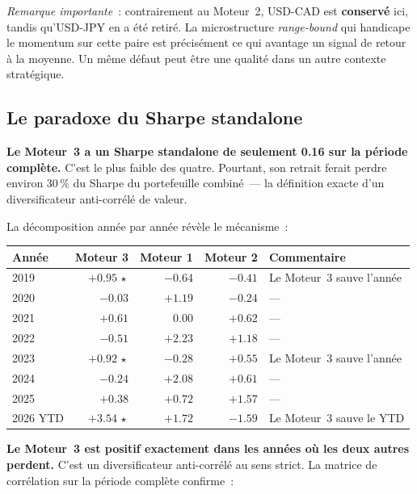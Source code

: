 \textit{Remarque importante}~: contrairement au Moteur~2, USD-CAD est \textbf{conservé} ici, tandis qu'USD-JPY en a été retiré. La microstructure \emph{range-bound} qui handicape le momentum sur cette paire est précisément ce qui avantage un signal de retour à la moyenne. Un même défaut peut être une qualité dans un autre contexte stratégique.

\subsection{Le paradoxe du Sharpe standalone}

\begin{warningbox}
\textbf{Le Moteur~3 a un Sharpe standalone de seulement 0.16 sur la période complète.} C'est le plus faible des quatre. Pourtant, son retrait ferait perdre environ 30\,\% du Sharpe du portefeuille combiné~--- la définition exacte d'un diversificateur anti-corrélé de valeur.
\end{warningbox}

La décomposition année par année révèle le mécanisme~:

\begin{center}
\renewcommand{\arraystretch}{1.1}
\begin{tabular}{lrrr p{4cm}}
\toprule
\textbf{Année} & \textbf{Moteur 3} & \textbf{Moteur 1} & \textbf{Moteur 2} & \textbf{Commentaire} \\
\midrule
2019 & \textcolor{rsiGreen}{$+0.95\,\star$} & $-0.64$ & $-0.41$ & Le Moteur~3 sauve l'année \\
2020 & $-0.03$ & $+1.19$ & $-0.24$ & --- \\
2021 & $+0.61$ & $0.00$ & $+0.62$ & --- \\
2022 & $-0.51$ & \textcolor{rsiGreen}{$+2.23$} & $+1.18$ & --- \\
2023 & \textcolor{rsiGreen}{$+0.92\,\star$} & $-0.28$ & $+0.55$ & Le Moteur~3 sauve l'année \\
2024 & $-0.24$ & $+2.08$ & $+0.61$ & --- \\
2025 & $+0.38$ & $+0.72$ & $+1.57$ & --- \\
2026 YTD & \textcolor{rsiGreen}{$+3.54\,\star$} & $+1.72$ & $-1.59$ & Le Moteur~3 sauve le YTD \\
\bottomrule
\end{tabular}
\end{center}

\textbf{Le Moteur~3 est positif exactement dans les années où les deux autres perdent.} C'est un diversificateur anti-corrélé au sens strict. La matrice de corrélation sur la période complète confirme~:

